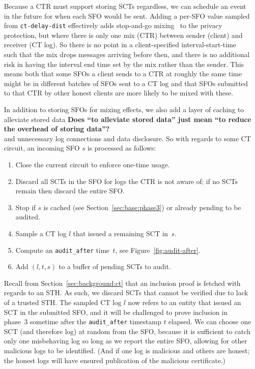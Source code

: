 Because a CTR must support storing SCTs regardless, we can schedule an event in the
future for when each SFO would be sent. 
Adding a per-SFO value sampled from \texttt{ct-delay-dist}
effectively adds stop-and-go mixing~\cite{kesdogan:ih1998} to the
privacy protection, but where there is only one mix (CTR) between
sender (client) and receiver (CT log). So there is no point in a
client-specified interval-start-time such that the mix drops messages
arriving before then, and there is no additional risk in having the
interval end time set by the mix rather than the sender. This means
both that some SFOs a client sends to a CTR at roughly the same time
might be in different batches of SFOs sent to a CT log and that SFOs
submitted to that CTR by other honest clients are more likely to be
mixed with these.


In addition to storing SFOs for mixing effects, we also add a layer of caching to
alleviate stored data {\bf \color{red} Does ``to alleviate stored data'' just mean ``to reduce the overhead of storing data''?}\\
and unnecessary log connections and data disclosure. So with
regards to some CT circuit, an incoming SFO $s$ is processed as follows:
\begin{enumerate}
    \item\label{enm:storage:close} Close the current circuit to enforce one-time
        usage.
    \item\label{enm:storage:unrecognized} Discard all SCTs in the SFO for logs the
        CTR is not aware of; if no SCTs remain then discard the entire SFO\@.
    \item\label{enm:storage:cached}
        Stop if $s$ is cached (see Section~\ref{sec:base:phase3}) or already
        pending to be audited.
    \item\label{enm:storage:fix-log} Sample a CT log $l$ that issued a
        remaining SCT in~$s$.
    \item\label{enm:storage:audit-after} Compute an \texttt{audit\_after}
		time~$t$, see Figure~\ref{fig:audit-after}.
    \item\label{enm:storage:store} Add $(l,t,s)$ to a buffer of pending SCTs to audit.
\end{enumerate}

Recall from Section~\ref{sec:background:ct} that an inclusion proof is fetched
with regards to an STH\@.  As such, we discard SCTs that cannot be verified due to
lack of a trusted STH\@.  The sampled CT log $l$ now refers to an entity that issued an
SCT in the submitted SFO, and it will be challenged to prove inclusion in phase~3
sometime after the \texttt{audit\_after} timestamp $t$ elapsed. We can choose one
SCT (and therefore log) at random from the SFO, because it is sufficient to catch
only one misbehaving log so long as we report the entire SFO, allowing for other
malicious logs to be identified. (And if one log is malicious and others are honest; the
honest logs will have ensured publication of the malicious certificate.)

